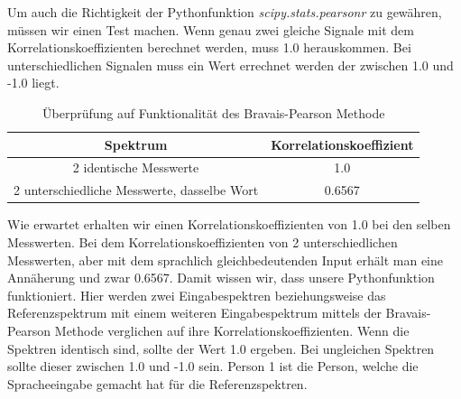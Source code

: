 \documentclass[12pt, oneside, a4paper, \docLanguage]{report}
\begin{document}
\newpage
Um auch die Richtigkeit der Pythonfunktion \textit{scipy.stats.pearsonr} zu gewähren, müssen wir einen Test machen.
\newline
Wenn genau zwei gleiche Signale mit dem Korrelationskoeffizienten berechnet werden, muss 1.0 herauskommen. 
\newline
Bei unterschiedlichen Signalen muss ein Wert errechnet werden der zwischen 1.0 und -1.0 liegt. 
\begin{table}[H]
	\centering\small
	\begin{tabular}{||c | c||}
		 \hline
		 \textbf{Spektrum} & \textbf{Korrelationskoeffizient} \\ [0.5ex] 
		 \hline
		 2 identische Messwerte & 1.0 \\ 
		 \hline
		 2 unterschiedliche Messwerte, dasselbe Wort & 0.6567 \\ 
		 \hline
	\end{tabular}
	\caption{Überprüfung auf Funktionalität des Bravais-Pearson Methode}
	\label{fig:Überprüfung auf Funktionalität des Bravais-Pearson Methode}
\end{table}
Wie erwartet erhalten wir einen Korrelationskoeffizienten von 1.0 bei den selben Messwerten.
Bei dem Korrelationskoeffizienten von 2 unterschiedlichen Messwerten, aber mit dem sprachlich gleichbedeutenden Input erhält man eine Annäherung und zwar 0.6567.
Damit wissen wir, dass unsere Pythonfunktion funktioniert.
\newpage
Hier werden zwei Eingabespektren beziehungsweise das Referenzspektrum mit einem weiteren Eingabespektrum mittels der Bravais-Pearson Methode verglichen auf ihre Korrelationskoeffizienten.
\newline
Wenn die Spektren identisch sind, sollte der Wert 1.0 ergeben. Bei ungleichen Spektren sollte dieser zwischen 1.0 und -1.0 sein.
Person 1 ist die Person, welche die Spracheeingabe gemacht hat für die Referenzspektren.
\end{document}
